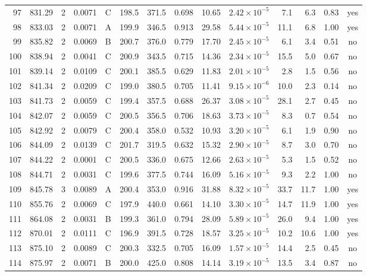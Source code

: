 \begin{landscape}
\begin{longtable}{rrrrlrrrrrrrrc}
97 & 831.29 & 2 & 0.0071 & C & 198.5 & 371.5 & 0.698 & 10.65 & $2.42\times10^{-5}$ & 7.1 & 6.3 & 0.83 & yes \\
98 & 833.03 & 2 & 0.0071 & A & 199.9 & 346.5 & 0.913 & 29.58 & $5.44\times10^{-5}$ & 11.1 & 6.8 & 1.00 & yes \\
99 & 835.82 & 2 & 0.0069 & B & 200.7 & 376.0 & 0.779 & 17.70 & $2.45\times10^{-5}$ & 6.1 & 3.4 & 0.51 & no \\
100 & 838.94 & 2 & 0.0041 & C & 200.9 & 343.5 & 0.715 & 14.36 & $2.34\times10^{-5}$ & 15.5 & 5.0 & 0.67 & no \\
101 & 839.14 & 2 & 0.0109 & C & 200.1 & 385.5 & 0.629 & 11.83 & $2.01\times10^{-5}$ & 2.8 & 1.5 & 0.56 & no \\
102 & 841.34 & 2 & 0.0209 & C & 199.0 & 380.5 & 0.705 & 11.41 & $9.15\times10^{-6}$ & 10.0 & 2.3 & 0.14 & no \\
103 & 841.73 & 2 & 0.0059 & C & 199.4 & 357.5 & 0.688 & 26.37 & $3.08\times10^{-5}$ & 28.1 & 2.7 & 0.45 & no \\
104 & 842.07 & 2 & 0.0059 & C & 200.5 & 356.5 & 0.706 & 18.63 & $3.73\times10^{-5}$ & 8.3 & 0.7 & 0.54 & no \\
105 & 842.92 & 2 & 0.0079 & C & 200.4 & 358.0 & 0.532 & 10.93 & $3.20\times10^{-5}$ & 6.1 & 1.9 & 0.90 & no \\
106 & 844.09 & 2 & 0.0139 & C & 201.7 & 319.5 & 0.632 & 15.32 & $2.90\times10^{-5}$ & 8.7 & 3.0 & 0.70 & no \\
107 & 844.22 & 2 & 0.0001 & C & 200.5 & 336.0 & 0.675 & 12.66 & $2.63\times10^{-5}$ & 5.3 & 1.5 & 0.52 & no \\
108 & 844.71 & 2 & 0.0031 & C & 199.6 & 377.5 & 0.744 & 16.09 & $5.16\times10^{-5}$ & 9.3 & 2.2 & 1.00 & no \\
109 & 845.78 & 3 & 0.0089 & A & 200.4 & 353.0 & 0.916 & 31.88 & $8.32\times10^{-5}$ & 33.7 & 11.7 & 1.00 & yes \\
110 & 855.76 & 2 & 0.0069 & C & 197.9 & 440.0 & 0.661 & 14.10 & $3.30\times10^{-5}$ & 14.7 & 11.9 & 1.00 & yes \\
111 & 864.08 & 2 & 0.0031 & B & 199.3 & 361.0 & 0.794 & 28.09 & $5.89\times10^{-5}$ & 26.0 & 9.4 & 1.00 & yes \\
112 & 870.01 & 2 & 0.0111 & C & 196.9 & 391.5 & 0.728 & 18.57 & $3.25\times10^{-5}$ & 10.2 & 10.6 & 1.00 & yes \\
113 & 875.10 & 2 & 0.0089 & C & 200.3 & 332.5 & 0.705 & 16.09 & $1.57\times10^{-5}$ & 14.4 & 2.5 & 0.45 & no \\
114 & 875.97 & 2 & 0.0071 & B & 200.0 & 425.0 & 0.808 & 14.14 & $3.19\times10^{-5}$ & 13.5 & 3.4 & 0.87 & no \\

\end{longtable}
\end{landscape}
